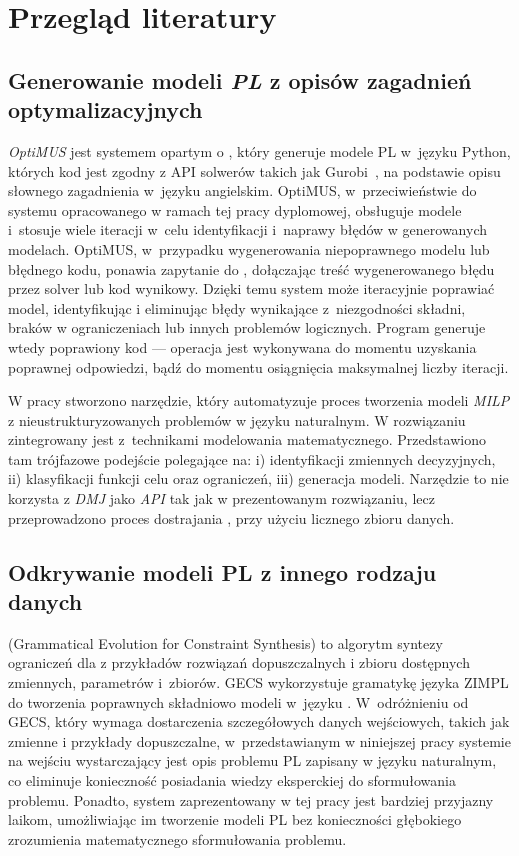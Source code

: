 \chapter{Przegląd literatury}\label{ch:review}

\section{Generowanie modeli \textit{PL} z opisów zagadnień optymalizacyjnych}
\label{sec:optimus}
\textit{OptiMUS} \cite{ahmaditeshnizi2023optimus} jest systemem opartym o , który generuje modele PL w~języku Python, których kod jest zgodny z API solwerów takich jak Gurobi~\cite{gurobi2023}, na podstawie opisu słownego zagadnienia w~języku angielskim.
OptiMUS, w~przeciwieństwie do systemu opracowanego w ramach tej pracy dyplomowej, obsługuje modele  i~stosuje wiele iteracji w~celu identyfikacji i~naprawy błędów w generowanych modelach.
OptiMUS, w~przypadku wygenerowania niepoprawnego modelu lub błędnego kodu, ponawia zapytanie do , dołączając treść wygenerowanego błędu przez solver lub kod wynikowy. Dzięki temu system może iteracyjnie poprawiać model, identyfikując i eliminując błędy wynikające z~niezgodności składni, braków w ograniczeniach lub innych problemów logicznych.
Program generuje wtedy poprawiony kod --- operacja jest wykonywana do momentu uzyskania poprawnej odpowiedzi, bądź do momentu osiągnięcia maksymalnej liczby iteracji.

W pracy \cite{li2023synthesizingmixedintegerlinearprogramming} stworzono narzędzie, który automatyzuje proces tworzenia modeli \textit{MILP} z nieustrukturyzowanych problemów w języku naturalnym. W rozwiązaniu zintegrowany jest  z~technikami modelowania matematycznego. Przedstawiono tam trójfazowe podejście polegające na: i) identyfikacji zmiennych decyzyjnych, ii) klasyfikacji funkcji celu oraz ograniczeń, iii) generacja modeli. Narzędzie to  nie korzysta z \textit{DMJ} jako \textit{API} tak jak w prezentowanym rozwiązaniu, lecz przeprowadzono proces dostrajania , przy użyciu licznego zbioru danych.

\section{Odkrywanie modeli PL z innego rodzaju danych}
 (Grammatical Evolution for Constraint Synthesis)  \cite{pawlak2021grammatical} to algorytm syntezy ograniczeń dla  z przykładów rozwiązań dopuszczalnych i zbioru dostępnych zmiennych, parametrów i~zbiorów. GECS wykorzystuje gramatykę języka ZIMPL do tworzenia poprawnych składniowo modeli  w~języku . W~odróżnieniu od GECS, który wymaga dostarczenia szczegółowych danych wejściowych, takich jak zmienne i przykłady dopuszczalne, w~przedstawianym w niniejszej pracy systemie na wejściu wystarczający jest opis problemu PL zapisany w języku naturalnym, co eliminuje konieczność posiadania wiedzy eksperckiej do sformułowania problemu. Ponadto, system zaprezentowany w tej pracy jest bardziej przyjazny laikom, umożliwiając im tworzenie modeli PL bez konieczności głębokiego zrozumienia matematycznego sformułowania problemu. 

